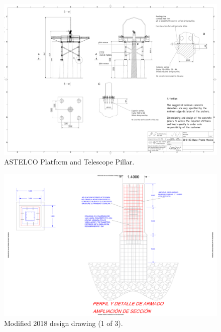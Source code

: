\begin{figure}
\begin{center}
\includegraphics[height=0.95\linewidth,angle=90]{figures/buildings-coatli-astelco-enclosure-drawing-6610}
\end{center}
\caption{{\projectname} ASTELCO Platform and Telescope Pillar.}
\label{figure:buildings-drawing-astelco}
\end{figure}

\begin{figure}
\begin{center}
\includegraphics[height=0.95\linewidth,angle=90]{figures/buildings-coatli-drawing-2018-1.pdf}
\end{center}
\caption{{\projectname} Modified 2018 design drawing (1 of 3).}
\label{figure:buildings-drawing-2018-1}
\end{figure}

